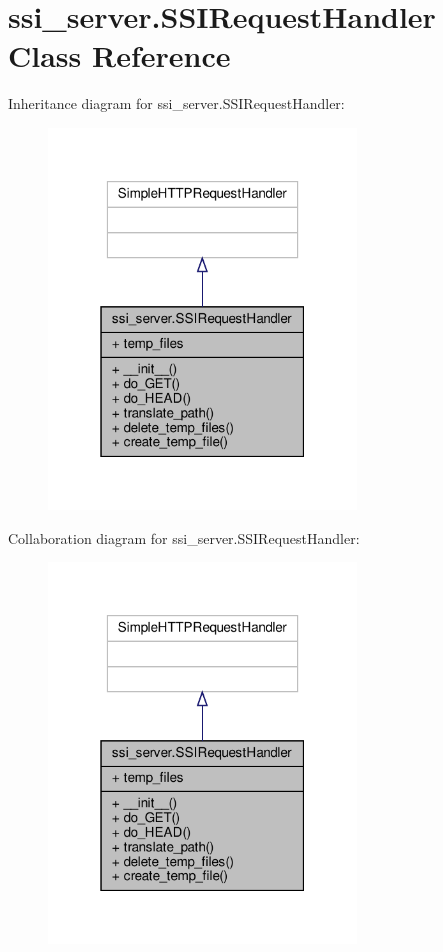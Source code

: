 \hypertarget{classssi__server_1_1SSIRequestHandler}{}\section{ssi\+\_\+server.\+S\+S\+I\+Request\+Handler Class Reference}
\label{classssi__server_1_1SSIRequestHandler}


Inheritance diagram for ssi\+\_\+server.\+S\+S\+I\+Request\+Handler\+:\nopagebreak
\begin{figure}[H]
\begin{center}
\leavevmode
\includegraphics[width=232pt]{classssi__server_1_1SSIRequestHandler__inherit__graph}
\end{center}
\end{figure}


Collaboration diagram for ssi\+\_\+server.\+S\+S\+I\+Request\+Handler\+:\nopagebreak
\begin{figure}[H]
\begin{center}
\leavevmode
\includegraphics[width=232pt]{classssi__server_1_1SSIRequestHandler__coll__graph}
\end{center}
\end{figure}
